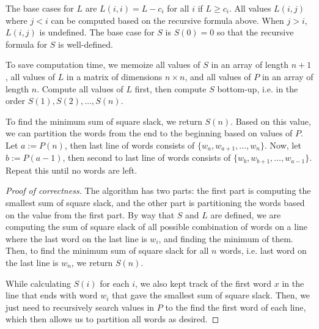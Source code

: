 \documentclass{article}
\begin{document}
The base cases for $L$ are $L(i,i) = L-c_i$ for all $i$ if $L\geq c_i$. All values $L(i,j)$ where $j<i$ can be computed based on the recursive formula above. When $j>i$, $L(i,j)$ is undefined. The base case for $S$ is $S(0)=0$ so that the recursive formula for $S$ is well-defined.

To save computation time, we memoize all values of $S$ in an array of length $n+1$, all values of $L$ in a matrix of dimensions $n\times n$, and all values of $P$ in an array of length $n$. Compute all values of $L$ first, then compute $S$ bottom-up, i.e. in the order $S(1), S(2),\dots, S(n)$.


To find the minimum sum of square slack, we return $S(n)$. Based on this value, we can partition the words from the end to the beginning based on values of $P$. Let $a := P(n)$, then last line of words consists of $\{w_a, w_{a+1},\dots,w_n \}$. Now, let $b := P(a-1)$, then second to last line of words consists of $\{w_b, w_{b+1},\dots,w_{a-1}  \}$. Repeat this until no words are left.

\begin{proof}[Proof of correctness]
The algorithm has two parts: the first part is computing the smallest sum of square slack, and the other part is partitioning the words based on the value from the first part. By way that $S$ and $L$ are defined, we are computing the sum of square slack of all possible combination of words on a line where the last word on the last line is $w_i$, and finding the minimum of them. Then, to find the minimum sum of square slack for all $n$ words, i.e. last word on the last line is $w_n$, we return $S(n)$.

While calculating $S(i)$ for each $i$, we also kept track of the first word $x$ in the line that ends with word $w_i$ that gave the smallest sum of square slack. Then, we just need to recursively search values in $P$ to the find the first word of each line, which then allows us to partition all words as desired.
\end{proof}
\end{document}
